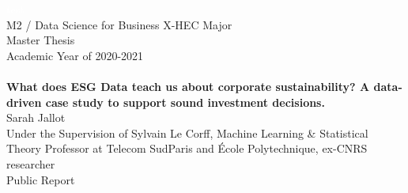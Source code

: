 \documentclass[12pt]{report}
\begin{document}
\begin{titlepage}
\begin{figure}[!tbp]
\end{figure}
\textcolor{white}{test}\\[0.5cm]
\center
{\large M2 / Data Science for Business X-HEC Major} \\[1cm]
{\large Master Thesis} \\
{\large Academic Year of 2020-2021} \\[1cm]
\HRule \\[0.2cm]
{\large \textbf{What does ESG Data teach us about corporate sustainability? A data-driven case study to support sound investment decisions.}}
\HRule \\[1cm]
{\large Sarah Jallot} \\ 
{\large Under the Supervision of Sylvain Le Corff, Machine Learning \& Statistical Theory Professor at Telecom SudParis and École Polytechnique, ex-CNRS researcher } \\ [1cm]
{\large Public Report} \\ 
\end{titlepage}
\end{document}
